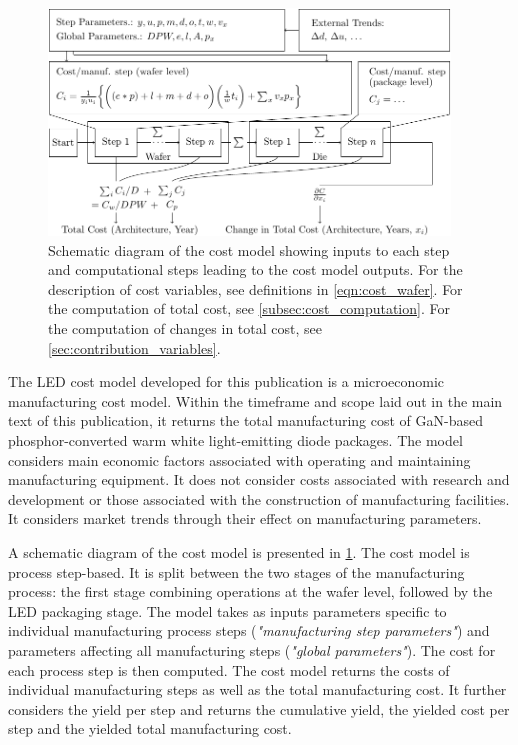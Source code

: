 \documentclass[parskip=full]{article}
\begin{document}
\begin{figure}[H]
    \centering
    \includegraphics[width=0.95\textwidth]{./figures/costmodel.pdf}
    \caption{Schematic diagram of the cost model showing inputs to each step and computational steps leading to the cost model outputs. For the description of cost variables, see definitions in \cref{eqn:cost_wafer}. For the computation of total cost, see \cref{subsec:cost_computation}. For the computation of changes in total cost, see \cref{sec:contribution_variables}.}
    \label{fig:costmodel-schematic}
\end{figure}

The LED cost model developed for this publication is a microeconomic manufacturing cost model. Within the timeframe and scope laid out in the main text of this publication, it returns the total manufacturing cost of GaN-based phosphor-converted warm white light-emitting diode packages. The model considers main economic factors associated with operating and maintaining manufacturing equipment. It does not consider costs associated with research and development or those associated with the construction of manufacturing facilities. It considers market trends through their effect on manufacturing parameters.

A schematic diagram of the cost model is presented in \cref{fig:costmodel-schematic}. The cost model is process step-based. It is split between the two stages of the manufacturing process: the first stage combining operations at the wafer level, followed by the LED packaging stage. The model takes as inputs parameters specific to individual manufacturing process steps (\textit{"manufacturing step parameters"}) and parameters affecting all manufacturing steps (\textit{"global parameters"}). The cost for each process step is then computed. The cost model returns the costs of individual manufacturing steps as well as the total manufacturing cost. It further considers the yield per step and returns the cumulative yield, the yielded cost per step and the yielded total manufacturing cost.
\end{document}
